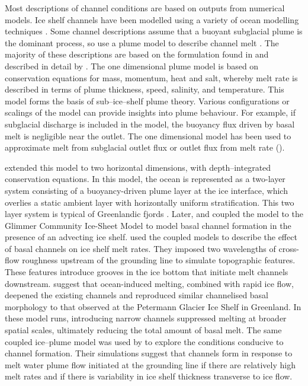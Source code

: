 Most descriptions of channel conditions are based on outputs from numerical models.
Ice shelf channels have been modelled using a variety of ocean modelling techniques  \citep[e.g.][]{millgate2013effect,gladish2012ice,sergienko2013basal,payne2007numerical}. 
Some channel descriptions assume that a buoyant subglacial plume is the dominant process, so use a plume model to describe channel melt \citep[e.g.][]{gladish2012ice, sergienko2013basal}.
The majority of these descriptions are based on the formulation found in \cite{jenkins2011convection} and described in detail by \cite{hewitt2020subglacial}.
The \cite{jenkins2011convection} one dimensional plume model is based on conservation equations for mass, momentum, heat and salt, whereby melt rate is described in terms of plume thickness, speed, salinity, and temperature. This model forms the basis of sub--ice--shelf plume theory. Various configurations or scalings of the model can provide insights into plume behaviour. For example, if subglacial discharge is included in the model, the buoyancy flux driven by basal melt is negligible near the outlet. The one dimensional model has been used to approximate melt from subglacial outlet flux \cite[e.g.][]{gourmelen2017channelized} or outlet flux from melt rate (\cite[e.g.][]{marsh2016high}).

\cite{holland2006effects} extended this model to two horizontal dimensions, with depth--integrated conservation equations. In this model, the ocean is represented as a two-layer system consisting of a buoyancy-driven plume layer at the ice interface, which overlies a static  ambient layer with horizontally uniform stratification. This two layer system is typical of Greenlandic fjords \citep{hewitt2020subglacial}.
Later, \cite{gladish2012ice,dallaston2015channelization} and \cite{sergienko2013regular} coupled the model to the Glimmer Community Ice-Sheet Model \citep{rutt2009glimmer} to model basal channel formation in the presence of an advecting ice shelf.
\cite{gladish2012ice} used the coupled models to describe the effect of basal channels on ice shelf melt rates. They imposed two wavelengths of cross-flow  roughness upstream of the grounding line to simulate topographic features. These features introduce grooves in the ice bottom that initiate melt channels downstream. \cite{gladish2012ice} suggest that ocean-induced melting, combined with rapid ice flow, deepened the existing channels and reproduced similar channelised basal morphology to that observed at the Petermann Glacier Ice Shelf in Greenland. In these model runs, introducing narrow channels suppressed melting at broader spatial scales, ultimately reducing the total amount of basal melt.
The same coupled ice--plume model was used by \cite{sergienko2013basal} to explore the conditions conducive to channel formation.  Their simulations suggest that channels form in response to melt water plume flow initiated at the grounding line if there are relatively high melt rates and if there is variability in ice shelf thickness transverse to ice flow.

